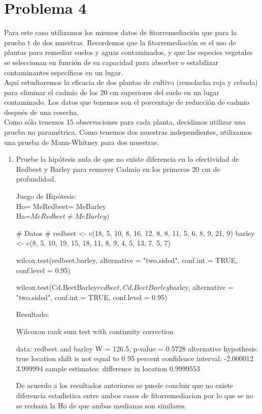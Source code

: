 \documentclass[a4paper,12pt]{article} %
\begin{document}
\section*{Problema 4}
Para este caso utilizamos los mismos datos de fitorremediación que para la prueba t de dos muestras. Recordemos que la fitorremediación es el uso de plantas para remediar suelos y aguas contaminados, y que las especies vegetales se seleccionan en función de su capacidad para absorber o estabilizar contaminantes específicos en un lugar.\\
Aquí estudiaremos la eficacia de dos plantas de cultivo (remolacha roja y cebada) para eliminar el cadmio de los 20 cm superiores del suelo en un lugar contaminado. Los datos que tenemos son el porcentaje de reducción de cadmio después de una cosecha.\\
Como sólo tenemos 15 observaciones para cada planta, decidimos utilizar una prueba no paramétrica. Como tenemos dos muestras independientes, utilizamos una prueba de Mann-Whitney para dos muestras.
\begin{enumerate} [label=\textbf{\alph*})]
	\item Pruebe la hipótesis nula de que no existe diferencia en la efectividad de Redbeet y Barley para remover Cadmio en los primeros 20 cm de profundidad.\\
	
	\begin{center}
		Juego de Hipótesis:\\
		Ho= MeRedbeet= MeBarley\\
		Ha=\(MeRedbeet \neq MeBarley)\)\\
	\end{center}
	\begin{MyVerbatim}
# Datos #
redbeet <- c(18, 5, 10, 8, 16, 12, 8, 8, 11, 5, 6, 8, 9, 21, 9)
barley <- c(8, 5, 10, 19, 15, 18, 11, 8, 9, 4, 5, 13, 7, 5, 7)

wilcox.test(redbeet,barley, 
alternative = "two.sided", conf.int = TRUE, conf.level = 0.95)

		
wilcox.test(Cd.BeetBarley$redbeet, Cd.BeetBarley$barley, 
alternative = "two.sided", conf.int = TRUE, conf.level = 0.95)
	\end{MyVerbatim}
Resultado:\\
\begin{MyVerbatim}
Wilcoxon rank sum test with continuity correction

data:  redbeet and barley
W = 126.5, p-value = 0.5728
alternative hypothesis: true location shift is not equal to 0
95 percent confidence interval: -2.000012  3.999994
sample estimates:
difference in location  0.9999553 
\end{MyVerbatim}
De acuerdo a los resultados anteriores se puede concluir que no existe diferencia estadistica entre ambos casos de fitorremediacion por lo que se no se rechaza la Ho de que ambas medianas son similares.
\end{enumerate}
\end{document}
